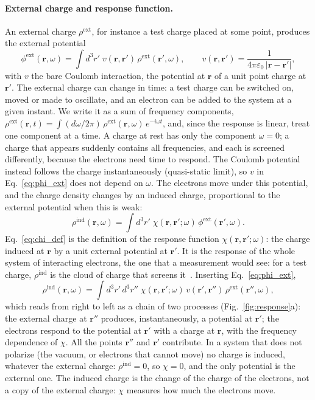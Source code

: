\documentclass[10pt,a4paper]{paper}
\begin{document}
\paragraph{External charge and response function.} An external charge $\rho^{\mathrm{ext}}$, for instance a test
charge placed at some point, produces the external potential
\begin{equation}
\phi^{\mathrm{ext}}(\bm{r},\omega) = \int d^3r'\;v(\bm{r},\bm{r}')\,\rho^{\mathrm{ext}}(\bm{r}',\omega) , \qquad
v(\bm{r},\bm{r}') = \frac{1}{4\pi\varepsilon_0\,|\bm{r} - \bm{r}'|} ,
\label{eq:phi_ext}
\end{equation}
with $v$ the bare Coulomb interaction, the potential at $\bm{r}$ of a unit point charge at $\bm{r}'$.
The external charge can change in time: a test charge can be switched on, moved or made to oscillate, and an electron
can be added to the system at a given instant. We write it as a sum of frequency components,
$\rho^{\mathrm{ext}}(\bm{r},t) = \int (d\omega/2\pi)\,\rho^{\mathrm{ext}}(\bm{r},\omega)\,e^{-i\omega t}$, and, since the
response is linear, treat one component at a time. A charge at rest has only the component $\omega = 0$; a charge that
appears suddenly contains all frequencies, and each is screened differently, because the electrons need time to
respond. The Coulomb potential instead follows the charge instantaneously (quasi-static limit), so $v$ in
Eq.~\eqref{eq:phi_ext} does not depend on $\omega$.
The electrons move under this potential, and the charge density changes by
an induced charge, proportional to the external potential when this is weak:
\begin{equation}
\rho^{\mathrm{ind}}(\bm{r},\omega) = \int d^3r'\;\chi(\bm{r},\bm{r}';\omega)\,\phi^{\mathrm{ext}}(\bm{r}',\omega) .
\label{eq:chi_def}
\end{equation}
Eq.~\eqref{eq:chi_def} is the definition of the response function $\chi(\bm{r},\bm{r}';\omega)$: the charge induced
at $\bm{r}$ by a unit external potential at $\bm{r}'$. It is the response of the whole system of interacting electrons, the one that a measurement would see: for
a test charge, $\rho^{\mathrm{ind}}$ is the cloud of charge that screens it~\cite{blase2018introduction}. Inserting
Eq.~\eqref{eq:phi_ext},
\begin{equation}
\rho^{\mathrm{ind}}(\bm{r},\omega) = \int d^3r'\,d^3r''\;\chi(\bm{r},\bm{r}';\omega)\,v(\bm{r}',\bm{r}'')\,
\rho^{\mathrm{ext}}(\bm{r}'',\omega) ,
\label{eq:chain}
\end{equation}
which reads from right to left as a chain of two processes (Fig.~\ref{fig:response}a): the external charge at
$\bm{r}''$ produces, instantaneously, a potential at $\bm{r}'$; the electrons respond to the potential at $\bm{r}'$
with a charge at $\bm{r}$, with the frequency dependence of $\chi$. All the points $\bm{r}''$ and $\bm{r}'$ contribute.
In a system that does not polarize (the vacuum, or electrons that cannot move) no charge is induced, whatever the
external charge: $\rho^{\mathrm{ind}} = 0$, so $\chi = 0$, and the only potential is the external one. The induced
charge is the change of the charge of the electrons, not a copy of the external charge: $\chi$ measures how much the
electrons move.
\end{document}
